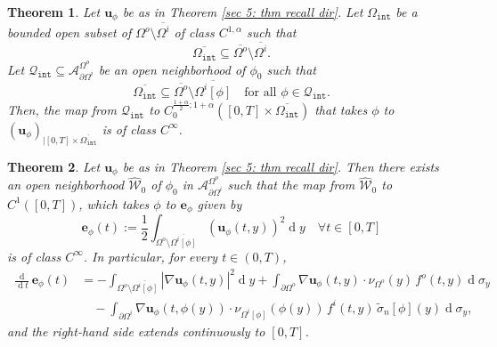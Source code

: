 \documentclass[10pt,a4paper]{amsart}
\newtheorem{theorem}{Theorem}
\renewcommand{\d}[1]{\ensuremath{\operatorname{d}\!{#1}}}
\begin{document}
\begin{theorem}\label{sec 5: thm smootheness dir}
    Let $\mathbf{u}_\phi$ be as in Theorem \ref{sec 5: thm recall dir}. Let $\Omega_\mathtt{int}$ be a bounded open subset of $\Omega^o\setminus \overline{\Omega^i}$ of class $C^{1,\alpha}$ such that
    \[
    \overline{\Omega_\mathtt{int}} \subseteq  \overline{\Omega^o} \setminus \overline{\Omega^i}.
    \]
    Let $\mathcal{Q}_\mathtt{int} \subseteq \mathcal{A}^{\Omega^o}_{\partial\Omega^i}$ be an open neighborhood of $\phi_0$ such that  
    \begin{equation*}
        \overline{\Omega_\mathtt{int}} \subseteq \overline{\Omega^o} \setminus \overline{\Omega^i[\phi]} \quad \text{for all }\phi \in \mathcal{Q}_\mathtt{int}.
    \end{equation*}
    Then, the map from $\mathcal{Q}_\mathtt{int}$ to $C_{0}^{\frac{1+\alpha}{2}; 1+\alpha}([0,T] \times \overline{\Omega_\mathtt{int}})$ that takes $\phi$ to $\left(\mathbf{u}_{\phi}\right)_{|[0,T]\times\overline{\Omega_\mathtt{int}}}$ is of class $C^\infty$.
\end{theorem}

\begin{theorem}\label{thm smooth energy dir}
    Let $\mathbf{u}_\phi$ be as in Theorem \ref{sec 5: thm recall dir}. Then there exists an open neighborhood $\widehat{\mathcal W}_0$ of $\phi_0$ in $\mathcal A_{\partial\Omega^i}^{\Omega^o}$ such that the map from $\widehat{\mathcal{W}}_0$ to $C^1([0,T])$, which takes $\phi$ to $\mathbf{e}_\phi$ given by
    \begin{equation*}
    \mathbf{e}_\phi(t) := \frac{1}{2} \int_{\Omega^o \setminus \overline{\Omega^i[\phi]}} (\mathbf{u}_\phi(t,y))^2 \d y \quad \forall t \in [0,T]
    \end{equation*}
    is of class $C^\infty$. In particular, for every $t\in(0,T)$,
    \begin{equation}\label{eq: derivative of e dir}
    \begin{aligned}
        \frac{\d{}}{\d t}\mathbf{e}_\phi(t) &= -\int_{\Omega^o \setminus \overline{\Omega^i[\phi]}} |\nabla \mathbf{u}_\phi(t,y)|^2 \d y + \int_{\partial\Omega^o}
        \nabla \mathbf{u}_\phi(t,y)\cdot \nu_{\Omega^o}(y)\,f^o(t,y) \d\sigma_y
        \\
        &\quad -\int_{\partial\Omega^i} \nabla \mathbf{u}_\phi(t,\phi(y))\cdot \nu_{\Omega^i[\phi]}(\phi(y))\,f^i(t,y) \, \tilde\sigma_n[\phi](y) \d\sigma_y,
    \end{aligned}
    \end{equation}
    and the right-hand side extends continuously to $[0,T]$.
\end{theorem}
\end{document}
